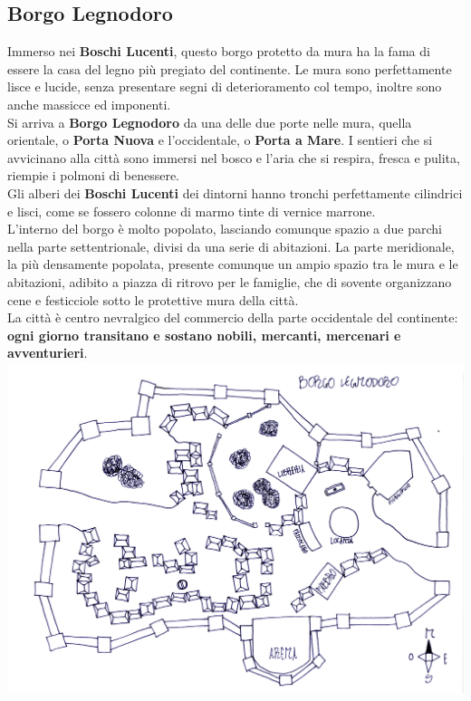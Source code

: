 \documentclass[10pt,twoside,onecolumn,openany]{book}
\begin{document}
\subsection{Borgo Legnodoro}
Immerso nei \textbf{Boschi Lucenti}, questo borgo protetto da mura ha la fama di essere la casa del legno più pregiato del continente. Le mura sono perfettamente lisce e lucide, senza presentare segni di deterioramento col tempo, inoltre sono anche massicce ed imponenti.\\
Si arriva a \textbf{Borgo Legnodoro} da una delle due porte nelle mura, quella orientale, o \textbf{Porta Nuova} e l'occidentale, o \textbf{Porta a Mare}. I sentieri che si avvicinano alla città sono immersi nel bosco e l'aria che si respira, fresca e pulita, riempie i polmoni di benessere.\\
Gli alberi dei \textbf{Boschi Lucenti} dei dintorni hanno tronchi perfettamente cilindrici e lisci, come se fossero colonne di marmo tinte di vernice marrone.\\
L'interno del borgo è molto popolato, lasciando comunque spazio a due parchi nella parte settentrionale, divisi da una serie di abitazioni. La parte meridionale, la più densamente popolata, presente comunque un ampio spazio tra le mura e le abitazioni, adibito a piazza di ritrovo per le famiglie, che di sovente organizzano cene e festicciole sotto le protettive mura della città.\\
La città è centro nevralgico del commercio della parte occidentale del continente: \textbf{ogni giorno transitano e sostano nobili, mercanti, mercenari e avventurieri}.
\\
\includegraphics[scale=0.6]{BLegnodoro}\\
\end{document}
